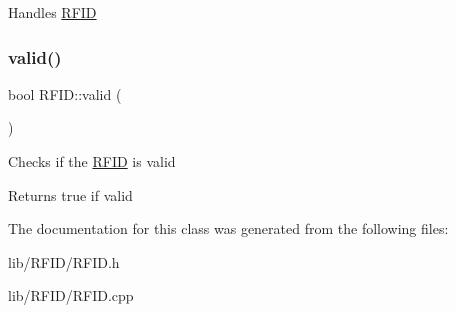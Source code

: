 Handles \hyperlink{class_r_f_i_d}{R\+F\+ID} \mbox{\label{class_r_f_i_d_aba5b7775ad04dfec3524a82520d4e8e5}} 
\subsubsection{\texorpdfstring{valid()}{valid()}}
{\footnotesize\ttfamily bool R\+F\+I\+D\+::valid (\begin{DoxyParamCaption}{ }\end{DoxyParamCaption})}

Checks if the \hyperlink{class_r_f_i_d}{R\+F\+ID} is valid \begin{DoxyReturn}{Returns}
true if valid 
\end{DoxyReturn}


The documentation for this class was generated from the following files\+:\begin{DoxyCompactItemize}
\item 
lib/\+R\+F\+I\+D/R\+F\+I\+D.\+h\item 
lib/\+R\+F\+I\+D/R\+F\+I\+D.\+cpp\end{DoxyCompactItemize}
